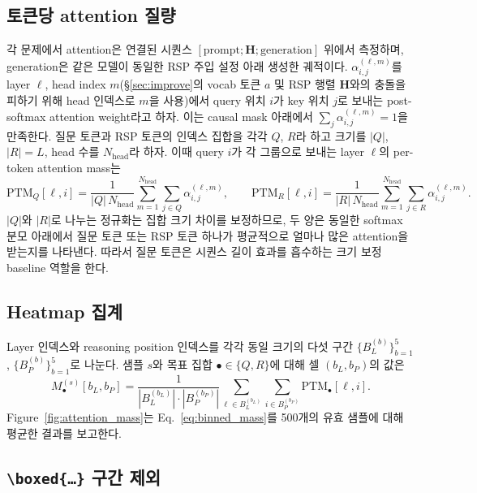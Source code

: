 \subsection{토큰당 attention 질량}

각 문제에서 attention은 연결된 시퀀스 $[\text{prompt}; \mathbf{H}; \text{generation}]$ 위에서 측정하며, generation은 같은 모델이 동일한 RSP 주입 설정 아래 생성한 궤적이다. $\alpha^{(\ell, m)}_{i,j}$를 layer $\ell$, head index $m$(\S\ref{sec:improve}의 vocab 토큰 $a$ 및 RSP 행렬 $\mathbf{H}$와의 충돌을 피하기 위해 head 인덱스로 $m$을 사용)에서 query 위치 $i$가 key 위치 $j$로 보내는 post-softmax attention weight라고 하자. 이는 causal mask 아래에서 $\sum_j \alpha^{(\ell, m)}_{i,j} = 1$을 만족한다. 질문 토큰과 RSP 토큰의 인덱스 집합을 각각 $Q$, $R$라 하고 크기를 $|Q|$, $|R| = L$, head 수를 $N_{\text{head}}$라 하자. 이때 query $i$가 각 그룹으로 보내는 layer $\ell$의 per-token attention mass는
\begin{equation}
\mathrm{PTM}_{Q}[\ell, i] = \frac{1}{|Q|\,N_{\text{head}}} \sum_{m=1}^{N_{\text{head}}} \sum_{j \in Q} \alpha^{(\ell, m)}_{i,j},
\qquad
\mathrm{PTM}_{R}[\ell, i] = \frac{1}{|R|\,N_{\text{head}}} \sum_{m=1}^{N_{\text{head}}} \sum_{j \in R} \alpha^{(\ell, m)}_{i,j}.
\label{eq:per_token_mass}
\end{equation}
$|Q|$와 $|R|$로 나누는 정규화는 집합 크기 차이를 보정하므로, 두 양은 동일한 softmax 분모 아래에서 질문 토큰 또는 RSP 토큰 하나가 평균적으로 얼마나 많은 attention을 받는지를 나타낸다. 따라서 질문 토큰은 시퀀스 길이 효과를 흡수하는 크기 보정 baseline 역할을 한다.

\subsection{Heatmap 집계}

Layer 인덱스와 reasoning position 인덱스를 각각 동일 크기의 다섯 구간 $\{B_L^{(b)}\}_{b=1}^{5}$, $\{B_P^{(b)}\}_{b=1}^{5}$로 나눈다. 샘플 $s$와 목표 집합 $\bullet \in \{Q, R\}$에 대해 셀 $(b_L, b_P)$의 값은
\begin{equation}
M^{(s)}_{\bullet}[b_L, b_P] = \frac{1}{|B_L^{(b_L)}| \cdot |B_P^{(b_P)}|} \sum_{\ell \in B_L^{(b_L)}} \sum_{i \in B_P^{(b_P)}} \mathrm{PTM}_{\bullet}[\ell, i].
\label{eq:binned_mass}
\end{equation}
Figure~\ref{fig:attention_mass}는 Eq.~\eqref{eq:binned_mass}를 500개의 유효 샘플에 대해 평균한 결과를 보고한다.

\subsection{\texttt{\textbackslash boxed\{\ldots\}} 구간 제외}

